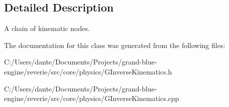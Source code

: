 \subsection{Detailed Description}
A chain of kinematic nodes. 

The documentation for this class was generated from the following files\+:\begin{DoxyCompactItemize}
\item 
C\+:/\+Users/dante/\+Documents/\+Projects/grand-\/blue-\/engine/reverie/src/core/physics/G\+Inverse\+Kinematics.\+h\item 
C\+:/\+Users/dante/\+Documents/\+Projects/grand-\/blue-\/engine/reverie/src/core/physics/G\+Inverse\+Kinematics.\+cpp\end{DoxyCompactItemize}
